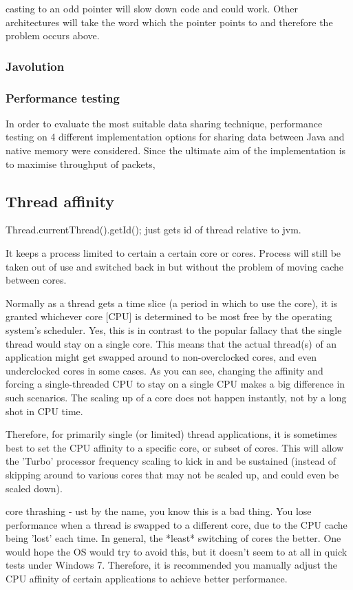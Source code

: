 \documentclass[final_report.tex]{subfiles}
\begin{document}
casting to an odd pointer will slow down code and could work. Other architectures will take the word which the pointer points to and therefore the problem occurs above.

\subsubsection{Javolution}
\subsubsection{Performance testing}
In order to evaluate the most suitable data sharing technique, performance testing on 4 different implementation options for sharing data between Java and native memory were considered. Since the ultimate aim of the implementation is to maximise throughput of packets, 


\subsection{Thread affinity}
Thread.currentThread().getId(); just gets id of thread relative to jvm.

It keeps a process limited to certain a certain core or cores. Process will still be taken out of use and switched back in but without the problem of moving cache between cores.

Normally as a thread gets a time slice (a period in which to use the core), it is granted whichever core [CPU] is determined to be most free by the operating system's scheduler. Yes, this is in contrast to the popular fallacy that the single thread would stay on a single core. This means that the actual thread(s) of an application might get swapped around to non-overclocked cores, and even underclocked cores in some cases. As you can see, changing the affinity and forcing a single-threaded CPU to stay on a single CPU makes a big difference in such scenarios. The scaling up of a core does not happen instantly, not by a long shot in CPU time.

Therefore, for primarily single (or limited) thread applications, it is sometimes best to set the CPU affinity to a specific core, or subset of cores. This will allow the 'Turbo' processor frequency scaling to kick in and be sustained (instead of skipping around to various cores that may not be scaled up, and could even be scaled down).

core thrashing - ust by the name, you know this is a bad thing. You lose performance when a thread is swapped to a different core, due to the CPU cache being 'lost' each time. In general, the *least* switching of cores the better. One would hope the OS would try to avoid this, but it doesn't seem to at all in quick tests under Windows 7. Therefore, it is recommended you manually adjust the CPU affinity of certain applications to achieve better performance.
\end{document}
